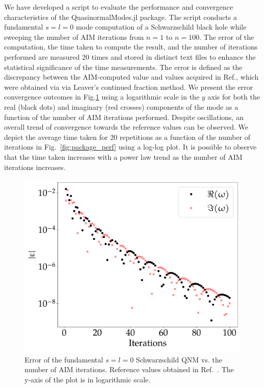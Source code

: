 We have developed a script to evaluate the performance and convergence characteristics of the QuasinormalModes.jl package. The script conducts a fundamental $s=l=0$ mode computation of a Schwarzschild black hole while sweeping the number of AIM iterations from $n=1$ to $n=100$. The error of the computation, the time taken to compute the result, and the number of iterations performed are measured 20 times and stored in distinct text files to enhance the statistical significance of the time measurements. The error is defined as the discrepancy between the AIM-computed value and values acquired in Ref.\cite{BertiQNMData}, which were obtained via via Leaver's continued fraction method. We present the error convergence outcomes in Fig.\ref{fig:package_error} using a logarithmic scale in the $y$ axis for both the real (black dots) and imaginary (red crosses) components of the mode as a function of the number of AIM iterations performed. Despite oscillations, an overall trend of convergence towards the reference values can be observed. We depict the average time taken for 20 repetitions as a function of the number of iterations in Fig.~\ref{fig:package_perf} using a log-log plot. It is possible to observe that the time taken increases with a power law trend as the number of AIM iterations increases.

\begin{figure}[!ht]
  \centering
  \includegraphics[width=\linewidth]{img/aim_qnm/err.pdf}
  \caption{Error of the fundamental $s=l=0$ Schwarzschild QNM vs. the number of AIM iterations. Reference values obtained in Ref.~\cite{BertiQNMData}. The y-axis of the plot is in logarithmic scale.}
  \label{fig:package_error}
\end{figure}

